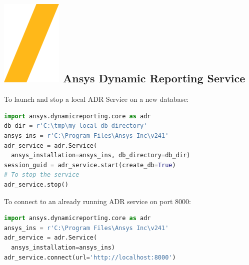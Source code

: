 \documentclass[9pt,landscape]{article}
\begin{document}
\begin{multicols}{3}
\setlength{\premulticols}{1pt}
\setlength{\postmulticols}{1pt}
\setlength{\multicolsep}{1pt}
\setlength{\columnsep}{2pt}

\section{\includegraphics[height=\fontcharht\font`\S]{slash.png} Ansys Dynamic Reporting Service}
To launch and stop a local ADR Service on a new database:
\begin{lstlisting}[language=Python]
import ansys.dynamicreporting.core as adr
db_dir = r'C:\tmp\my_local_db_directory'
ansys_ins = r'C:\Program Files\Ansys Inc\v241'
adr_service = adr.Service(
  ansys_installation=ansys_ins, db_directory=db_dir)
session_guid = adr_service.start(create_db=True)
# To stop the service
adr_service.stop()
\end{lstlisting}

To connect to an already running ADR service on port 8000:

\begin{lstlisting}[language=Python]
import ansys.dynamicreporting.core as adr
ansys_ins = r'C:\Program Files\Ansys Inc\v241'
adr_service = adr.Service(
  ansys_installation=ansys_ins)
adr_service.connect(url='http://localhost:8000') 
\end{lstlisting}


\end{multicols}
\end{document}
